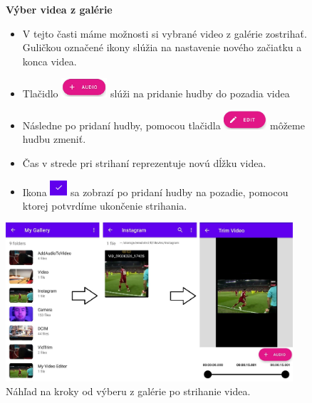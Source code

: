 \documentclass[12pt, oneside]{book}
\begin{document}
\begin{figure}[H]

    \hspace{15pt} \textbf{Výber videa z galérie}

 \begin{itemize}
        \item  V tejto časti máme možnosti si vybrané video z galérie zostrihať. Guličkou označené ikony slúžia na nastavenie nového začiatku a konca videa. 
        \item Tlačidlo  \includegraphics[width=0.16\textwidth]{images/audio plus.png} slúži na pridanie hudby do pozadia videa
        
        \item Následne po pridaní hudby, pomocou tlačidla \includegraphics[width=0.15\textwidth]{images/edit.jpg} môžeme hudbu zmeniť.
        
        \item Čas v strede pri strihaní reprezentuje novú dĺžku videa.
        
        \item Ikona \includegraphics[width=0.06\textwidth]{images/fajka.jpg} sa zobrazí po pridaní hudby na pozadie, pomocou ktorej potvrdíme ukončenie strihania.
     
    \end{itemize} 
   
    \vspace{25pt}
    
  \includegraphics[width=0.95\textwidth]{images/trim.jpg}
    \caption{Náhľad na kroky od výberu z galérie po strihanie videa. }
    \label{fig:obr13}
\end{figure}
\end{document}
